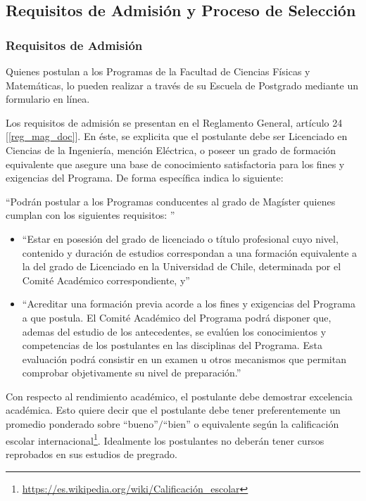 
\subsection{Requisitos de Admisión y Proceso de Selección}

\subsubsection{Requisitos de Admisión}

Quienes postulan a los Programas de la Facultad de Ciencias Físicas y Matemáticas, lo pueden
realizar a través de su Escuela de Postgrado mediante un formulario en línea.

Los requisitos de admisión se presentan en el Reglamento General, artículo 24 [\ref{reg_mag_doc}]. En éste, se explicita que
el postulante debe ser Licenciado en Ciencias de la Ingeniería, mención Eléctrica, o poseer un
grado de formación equivalente que asegure una base de conocimiento satisfactoria para los fines
y exigencias del Programa. De forma específica indica lo siguiente:

``Podrán postular a los Programas conducentes al grado de Magíster quienes cumplan con los
siguientes requisitos: ''

\begin{itemize}
\item ``Estar en posesión del grado de licenciado o título profesional cuyo nivel, contenido y
duración de estudios correspondan a una formación equivalente a la del grado de
Licenciado en la Universidad de Chile, determinada por el Comité Académico
correspondiente, y''
\item ``Acreditar una formación previa acorde a los fines y exigencias del Programa a que
postula. El Comité Académico del Programa podrá disponer que, ademas del estudio de los
antecedentes, se evalúen los conocimientos y competencias de los postulantes en las
disciplinas del Programa. Esta evaluación podrá consistir en un examen u otros
mecanismos que permitan comprobar objetivamente su nivel de preparación.''
\end{itemize}

Con respecto al rendimiento académico, el postulante debe demostrar excelencia académica. Esto 
quiere decir que el postulante debe tener preferentemente un promedio ponderado sobre
``bueno''$/$``bien'' o equivalente según la calificación escolar internacional\footnote{\url{https://es.wikipedia.org/wiki/Calificación_escolar}}.
Idealmente los postulantes no deberán tener cursos reprobados en sus estudios de pregrado.


